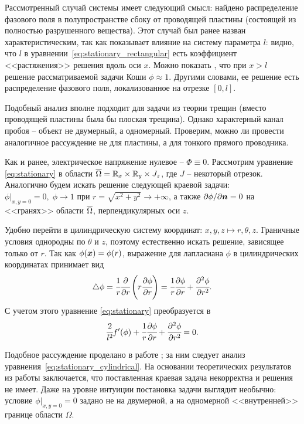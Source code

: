 Рассмотренный случай системы имеет следующий смысл: найдено распределение фазового поля в полупространстве сбоку от проводящей пластины (состоящей из полностью разрушенного вещества). Этот случай был ранее назван характеристическим, так как показывает влияние на систему параметра $l$: видно, что $l$ в уравнении~\eqref{eq:stationary_rectangular} есть коэффициент <<растяжения>> решения вдоль оси $x$. Можно показать \cite{zipunova_higher_codimension}, что при $x > l$ решение рассматриваемой задачи Коши $\phi \approx 1$. Другими словами, ее решение есть распределение фазового поля, локализованное на отрезке $[0, l]$.

Подобный анализ вполне подходит для задачи из теории трещин (вместо проводящей пластины была бы плоская трещина). Однако характерный канал пробоя -- объект не двумерный, а одномерный. Проверим, можно ли провести аналогичное рассуждение не для пластины, а для тонкого прямого проводника.

Как и ранее, электрическое напряжение нулевое -- $\Phi \equiv 0$. Рассмотрим уравнение \eqref{eq:stationary} в области ${\overline{\Omega}} = {\mathbb{R}}_x \times {\mathbb{R}}_y \times J_z$, где $J$ -- некоторый отрезок. Аналогично будем искать решение следующей краевой задачи: $\phi|_{x, y = 0} = 0, \; \phi \to 1$ при $r = \sqrt{x^2 + y^2} \to +\infty$, а также $\partial \phi / \partial {\boldsymbol{n}} = 0$ на <<гранях>> области ${\overline{\Omega}}$, перпендикулярных оси $z$.

Удобно перейти в цилиндрическую систему координат: $x, y, z \mapsto r, \theta, z$. Граничные условия однородны по $\theta$ и $z$, поэтому естественно искать решение, зависящее только от $r$. Так как $\phi({\boldsymbol{x}}) = \phi(r)$, выражение для лапласиана $\phi$ в цилиндрических координатах принимает вид
$$\triangle \phi = \cfrac{1}{r} \cfrac{\partial}{\partial r} \left( r \cfrac{\partial \phi}{\partial r} \right) = \cfrac{1}{r} \cfrac{\partial \phi}{\partial r} + \cfrac{\partial ^2 \phi}{\partial r^2} {\text{.}}$$
С учетом этого уравнение \eqref{eq:stationary} преобразуется в
\begin{equation}
    \cfrac{2}{l^2} f'(\phi) + \cfrac{1}{r} \cfrac{\partial \phi}{\partial r} + \cfrac{\partial ^2 \phi}{\partial r^2} = 0 {\text{.}}
    \label{eq:stationary_cylindrical}
\end{equation}

Подобное рассуждение проделано в работе \cite{zipunova_higher_codimension}; за ним следует анализ уравнения~\eqref{eq:stationary_cylindrical}. На основании теоретических результатов из работы \cite{cirstea_elliptic_equations} заключается, что поставленная краевая задача некорректна и решения не имеет. Даже на уровне интуиции постановка задачи выглядит необычно: условие $\phi|_{x, y = 0} = 0$ задано не на двумерной, а на одномерной <<внутренней>> границе области $\Omega$.

